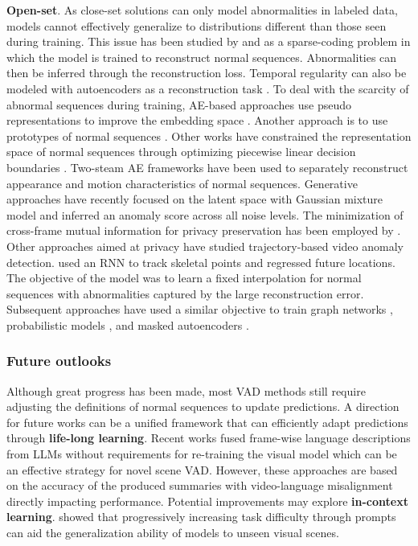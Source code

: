 \noindent
\textbf{Open-set}. As close-set solutions can only model abnormalities in labeled data, models cannot effectively generalize to distributions different than those seen during training. This issue has been studied by \citet{zhao2011online} and \citet{luo2017revisit} as a sparse-coding \citep{lee2006efficient} problem in which the model is trained to reconstruct normal sequences. Abnormalities can then be inferred through the reconstruction loss. Temporal regularity can also be modeled with autoencoders as a reconstruction task \citep{hasan2016learning}. To deal with the scarcity of abnormal sequences during training, AE-based approaches use pseudo representations to improve the embedding space \citep{astrid2021synthetic,astrid2021learning}. Another approach is to use prototypes of normal sequences \citep{park2020learning}. Other works have constrained the representation space of normal sequences through optimizing piecewise linear decision boundaries \citep{wang2019gods}. Two-steam AE frameworks \citep{cho2022unsupervised,nguyen2019anomaly} have been used to separately reconstruct appearance and motion characteristics of normal sequences. Generative approaches \citep{micorek2024mulde} have recently focused on the latent space with Gaussian mixture model and inferred an anomaly score across all noise levels. The minimization of cross-frame mutual information for privacy preservation has been employed by \citet{fioresi2023ted}\textbf{}. Other approaches aimed at privacy have studied trajectory-based video anomaly detection. \citet{morais2019learning} used an RNN to track skeletal points and regressed future locations. The objective of the model was to learn a fixed interpolation for normal sequences with abnormalities captured by the large reconstruction error. Subsequent approaches have used a similar objective to train graph networks \citep{markovitz2020graph}, probabilistic models \citep{flaborea2023multimodal}, and masked autoencoders \citep{stergiou2024holistic}.


\subsubsection{Future outlooks}

Although great progress has been made, most VAD methods still require adjusting the definitions of normal sequences to update predictions. A direction for future works can be a unified framework that can efficiently adapt predictions through \textbf{life-long learning}. Recent works \citep{yang2024text,zanella2024harnessing} fused frame-wise language descriptions from LLMs without requirements for re-training the visual model which can be an effective strategy for novel scene VAD. However, these approaches are based on the accuracy of the produced summaries with video-language misalignment directly impacting performance. Potential improvements may explore \textbf{in-context learning}. \citet{zhao2024can} showed that progressively increasing task difficulty through prompts can aid the generalization ability of models to unseen visual scenes.
